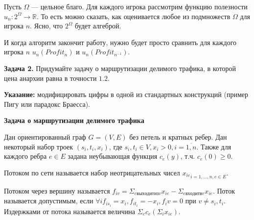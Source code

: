 \documentclass[]{article}
\newcommand{\task}[1]{\textbf{Задача #1. }}
\begin{document}
Пусть $\Omega$ --- цельное благо.
Для каждого игрока рассмотрим функцию полезности $u_n: 2^\Omega \to \mathbb{R}$.
То есть можно сказать, как оценивается любое из подмножеств $\Omega$ для игрока $n$.
Ясно, что $2^\Omega$ будет алгеброй.

И когда алгоритм закончит работу, нужно будет просто сравнить для каждого игрока $n$ $u_n(Profit_n)$ и $u_n(Profit_{n^{-1}})$.


\task{2} Придумайте задачу о маршрутизации делимого трафика, в которой цена анархии равна в точности  $1.2$.

\textbf{Указание:} модифицировать цифры в одной из стандартных конструкций (пример Пигу или парадокс Браесса).

\textbf{Задача о маршрутизации делимого трафика}\cite{t2014}

Дан ориентированный граф $G=(V,E)$ без петель и кратных ребер. Дан некоторый набор троек $(s_i, t_i, x_i)$, где $s_i,t_i\in V, x_i>0, i=\overline{1,n}$. 
Также для каждого ребра $e\in E$ задана неубывающая функция $c_e(y)$, т.ч. $c_e(0)\ge0$. 

Потоком по сети называется набор неотрицательных чисел ${x_{ie}}_{i=1,...,n, e\in E}$.

Потоком через вершину называется $f_{iv}=\Sigma_{e выходит из v}x_{ie} - \Sigma_{e входит в v}x_{ie}$. Поток называется допустимым, если $\forall i f_{is_i}=x_i, f_{it_i}=-x_i, f_iv=0$ при $v\ne s_i,t_i$. Издержками от потока называется величина $\Sigma_e c_e (\Sigma_i x_{ie})$. 




\printbibliography
\end{document}
